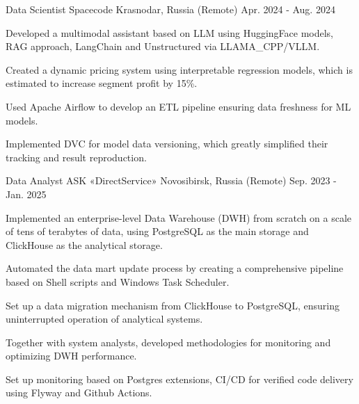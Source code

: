 \begin{cventries}
  \cventry
    {Data Scientist} %
    {Spacecode} %
    {Krasnodar, Russia (Remote)} %
    {Apr. 2024 - Aug. 2024} %
    {
      \begin{cvitems} %
        \item {Developed a multimodal assistant based on LLM using HuggingFace models, RAG approach, LangChain and Unstructured via LLAMA\_CPP/VLLM.}
        \item {Created a dynamic pricing system using interpretable regression models, which is estimated to increase segment profit by 15\%.}
        \item {Used Apache Airflow to develop an ETL pipeline ensuring data freshness for ML models.}
        \item {Implemented DVC for model data versioning, which greatly simplified their tracking and result reproduction.}
      \end{cvitems}
    }

  \cventry
    {Data Analyst} %
    {ASK «DirectService»} %
    {Novosibirsk, Russia (Remote)} %
    {Sep. 2023 - Jan. 2025} %
    {
      \begin{cvitems} %
        \item {Implemented an enterprise-level Data Warehouse (DWH) from scratch on a scale of tens of terabytes of data, using PostgreSQL as the main storage and ClickHouse as the analytical storage.}
        \item {Automated the data mart update process by creating a comprehensive pipeline based on Shell scripts and Windows Task Scheduler.}
        \item {Set up a data migration mechanism from ClickHouse to PostgreSQL, ensuring uninterrupted operation of analytical systems.}
        \item {Together with system analysts, developed methodologies for monitoring and optimizing DWH performance.}
        \item {Set up monitoring based on Postgres extensions, CI/CD for verified code delivery using Flyway and Github Actions.}
      \end{cvitems}
    }


\end{cventries}
